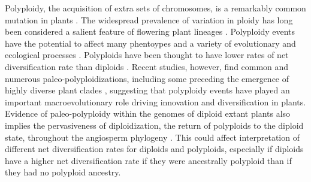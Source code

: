 Polyploidy, the acquisition of extra sets of chromosomes, is a remarkably common mutation in plants \citep{husband_2013, zenilferguson_2017}.
The widespread prevalence of variation in ploidy has long been considered a salient feature of flowering plant lineages \citep{stebbins1938}. 
Polyploidy events have the potential to affect many phentoypes and a variety of evolutionary \citep{ramsey_2002} and ecological processes \citep{sessa_2019}.
Polyploids have been thought to have lower rates of net diversification rate than diploids \citep{mayrose_2011, mayrose_2015}. 
Recent studies, however, find common and numerous paleo-polyploidizations, including some preceding the emergence of highly diverse plant clades \citep{soltis_2014, landis_2018}, suggesting that polyploidy events have played an important macroevolutionary role driving innovation and diversification in plants.
Evidence of paleo-polyploidy within the genomes of diploid extant plants also implies the pervasiveness of diploidization, the return of polyploids to the diploid state, throughout the angiosperm phylogeny \citep{soltis_2015, dodsworth_2015}.
This could affect interpretation of different net diversification rates for diploids and polyploids, especially if diploids have a higher net diversification rate if they were ancestrally polyploid than if they had no polyploid ancestry.

